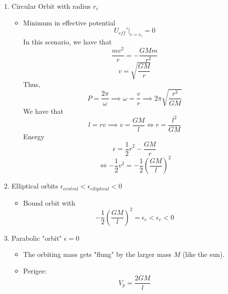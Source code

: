 \documentclass{article}
\newtheorem{one minute paper}[theorem]{One Minute Paper}
\begin{document}
\begin{enumerate}
    \item Circular Orbit with radius $r_c$
    \begin{itemize}
        \item Minimum in effective potential
        \begin{equation}
            U_{eff}'|_{r=r_c} = 0
        \end{equation}
        In this scenario, we have that 
    \begin{equation}
        \frac{mv^2}{r} = -\frac{GMm}{r^2}
    \end{equation}
    \begin{equation}
        v = \sqrt{\frac{GM}{r}}
    \end{equation}
    Thus, 
    \begin{equation}
        P = \frac{2\pi}{\omega} \implies \omega = \frac{v}{r} \implies 2\pi \sqrt{\frac{r^3}{GM}}
    \end{equation}
    We have that 
    \begin{equation}
        l = rv \implies v = \frac{GM}{l} \iff r = \frac{l^2}{GM}
    \end{equation}
    Energy
    \begin{equation}
        \epsilon = \frac{1}{2}\dot{r}^2 - \frac{GM}{r}
    \end{equation}
    \begin{equation}
        \iff -\frac{1}{2}v^2 = -\frac{1}{2}(\frac{GM}{l})^2
    \end{equation}
    \end{itemize}
    \item Elliptical orbits $\epsilon_{central} < \epsilon_{elliptical} < 0$
    \begin{itemize}
        \item Bound orbit with 
        \begin{equation}
            -\frac{1}{2}(\frac{GM}{l})^2 = \epsilon_c < \epsilon_e < 0
        \end{equation}
    \end{itemize}
    \item Parabolic "orbit" $\epsilon = 0$
    \begin{itemize}
        \item The orbiting mass gets "flung" by the larger mass $M$ (like the sun).
        \item Perigee:
        \begin{equation}
            V_p = \frac{2GM}{l}
        \end{equation}

\end{itemize}
\end{enumerate}
\end{document}

